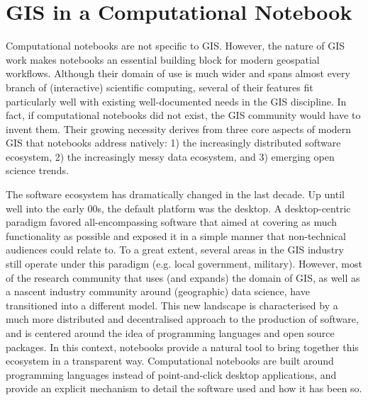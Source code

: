 \documentclass[11pt,letterpaper]{article}
\begin{document}
\section{GIS in a Computational Notebook}

Computational notebooks are not specific to GIS. However, the nature of GIS work makes notebooks an essential building block for modern geospatial workflows. Although their domain of use is much wider and spans almost every branch of (interactive) scientific computing, several of their features fit particularly well with existing well-documented needs in the GIS discipline. In fact, if computational notebooks did not exist, the GIS community would have to invent them. Their growing necessity derives from three core aspects of modern GIS that notebooks address natively: 1) the increasingly distributed software ecosystem, 2) the increasingly messy data ecosystem, and 3) emerging open science trends.

The software ecosystem has dramatically changed in the last decade.
Up until well into the early 00s, the default platform was the desktop. A desktop-centric paradigm favored all-encompassing software that aimed at covering as much functionality as possible and exposed it in a simple manner that non-technical audiences could relate to.
To a great extent, several areas in the GIS industry still operate under this paradigm (e.g. local government, military).
However, most of the research community that uses (and expands) the domain of GIS, as well as a nascent industry community around (geographic) data science, have transitioned into a different model. This new landscape is characterised by a much more distributed and decentralised approach to the production of software, and is centered around the idea of programming languages and open source packages.
In this context, notebooks provide a natural tool to bring together this ecosystem in a transparent way. Computational notebooks are built around programming languages instead of point-and-click desktop applications, and provide an explicit mechanism to detail the software used and how it has been so.
\end{document}
